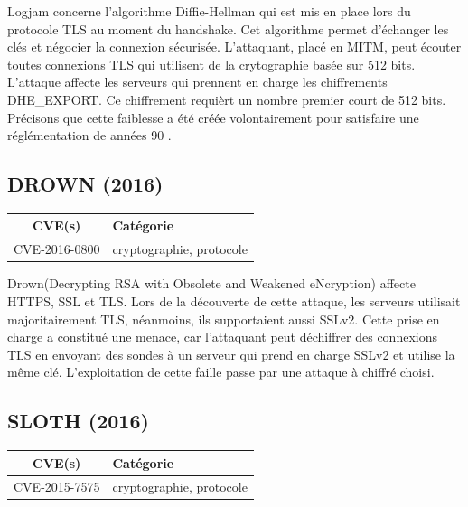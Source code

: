 Logjam concerne l'algorithme Diffie-Hellman qui est mis en place lors du protocole TLS au moment du handshake. Cet algorithme permet d'échanger les clés et négocier la connexion sécurisée. L'attaquant, placé en MITM, peut écouter toutes connexions TLS qui utilisent de la crytographie basée sur 512 bits. L'attaque affecte les serveurs qui prennent en charge les chiffrements DHE\_EXPORT. Ce chiffrement requièrt un nombre premier court de 512 bits. Précisons que cette faiblesse a été créée volontairement pour satisfaire une réglémentation de années 90
\cite{logjam}.




\subsection{DROWN (2016)}

\begin{tabularx}{0.96\textwidth}{|c|X|}
  \hline
  \textbf{CVE(s)} & \textbf{Catégorie} \\
  \hline
  CVE-2016-0800 & cryptographie, protocole \\
  \hline
\end{tabularx}

\vspace{1em}

Drown(Decrypting RSA with Obsolete and Weakened eNcryption) affecte HTTPS, SSL et TLS. Lors de la découverte de cette attaque, les serveurs utilisait majoritairement TLS, néanmoins, ils supportaient aussi SSLv2. Cette prise en charge a constitué une menace, car l'attaquant peut déchiffrer des connexions TLS en envoyant des sondes à un serveur qui prend en charge SSLv2 et utilise la même clé. L'exploitation de cette faille passe par une attaque à chiffré choisi\cite{drown}.




\subsection{SLOTH (2016)}

\begin{tabularx}{0.96\textwidth}{|c|X|}
  \hline
  \textbf{CVE(s)} & \textbf{Catégorie} \\
  \hline
  CVE-2015-7575 & cryptographie, protocole \\
  \hline
\end{tabularx}

